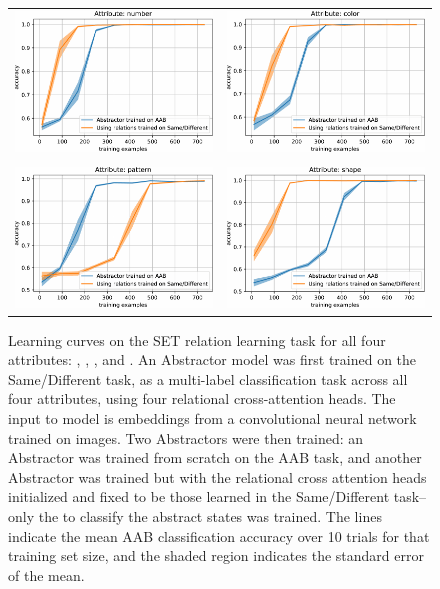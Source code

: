 \begin{figure}[t!]
	\begin{center}
	\begin{tabular}{cc}
		\includegraphics[width=.42\textwidth]{figures/set/AAB_comparison_number-crop} &
		\includegraphics[width=.42\textwidth]{figures/set/AAB_comparison_color-crop} \\
		&\\
		\includegraphics[width=.42\textwidth]{figures/set/AAB_comparison_pattern-crop} &
		\includegraphics[width=.42\textwidth]{figures/set/AAB_comparison_shape-crop}
	\end{tabular}
	\caption{Learning curves on the SET relation learning task for all four attributes: , ,
		, and .  An Abstractor model was first trained on the Same/Different task, as a multi-label classification task across all four attributes, using four relational cross-attention heads. The input to model is embeddings from a convolutional neural network trained on images. Two Abstractors were then trained: an Abstractor was trained from scratch on the AAB task, and another Abstractor was trained but with the relational cross attention heads initialized and fixed to be those learned in the Same/Different task--only the \MLP to classify the abstract states was trained. The lines indicate the mean AAB classification accuracy over 10 trials for that training set size, and the shaded region indicates the standard error of the mean.}
	\label{fig:aab_learning_curves}
    \end{center}
\end{figure}

